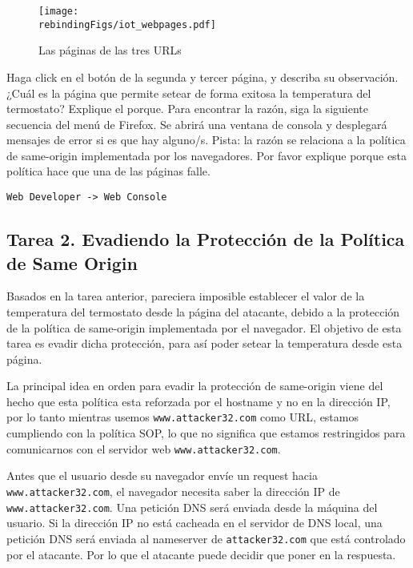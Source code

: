 \begin{figure}[htb]
\begin{center}
\texttt{[image: \\rebindingFigs/iot\_webpages.pdf]}
\end{center}
\caption{Las páginas de las tres URLs}
\label{rebinding:fig:webpages}
\end{figure}
 
Haga click en el botón de la segunda y tercer página, y describa su observación. ¿Cuál es la página que permite setear de forma exitosa la temperatura del termostato? Explique el porque.
Para encontrar la razón, siga la siguiente secuencia del menú de Firefox. Se abrirá una ventana de consola y desplegará mensajes de error si es que hay alguno/s. Pista: la razón se relaciona a la política de same-origin implementada por los navegadores. Por favor explique porque esta política hace que una de las páginas falle.

 
\begin{lstlisting}
Web Developer -> Web Console
\end{lstlisting}
  


\subsection{Tarea 2. Evadiendo la Protección de la Política de Same Origin}

Basados en la tarea anterior, pareciera imposible establecer el valor de la temperatura del termostato desde la página del atacante, debido a la protección de la política de same-origin implementada por el navegador. El objetivo de esta tarea es evadir dicha protección, para así poder setear la temperatura desde esta página.

La principal idea en orden para evadir la protección de same-origin viene del hecho que esta política esta reforzada por el hostname y no en la dirección IP, por lo tanto mientras usemos \texttt{www.attacker32.com} como URL, estamos cumpliendo con la política SOP, lo que no significa que estamos restringidos para comunicarnos con el servidor web \texttt{www.attacker32.com}.

Antes que el usuario desde su navegador envíe un request hacia \texttt{www.attacker32.com}, el navegador necesita saber la dirección IP de \texttt{www.attacker32.com}. Una petición DNS será enviada desde la máquina del usuario. Si la dirección IP no está cacheada en el servidor de DNS local, una petición DNS será enviada al nameserver de \texttt{attacker32.com} que está controlado por el atacante.
Por lo que el atacante puede decidir que poner en la respuesta.


